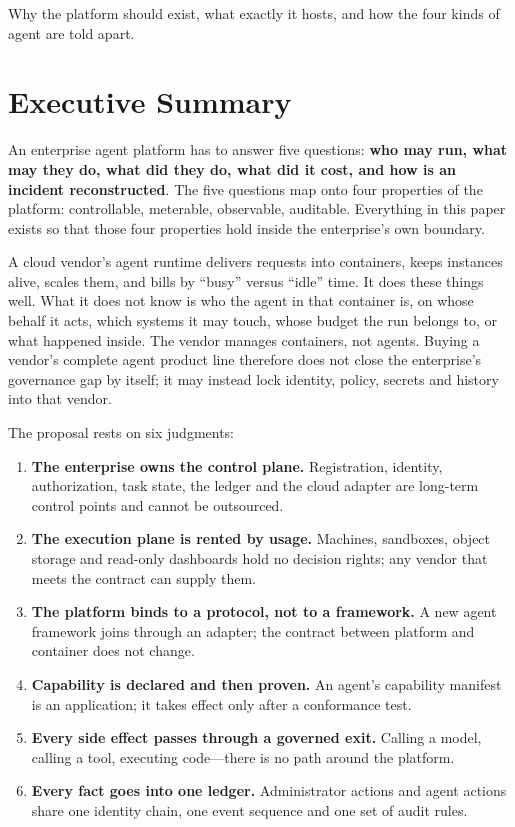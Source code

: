 {Why the platform should exist, what exactly it hosts, and how the four kinds of agent are told apart.}

\section{Executive Summary}
\label{sec:exec}

An enterprise agent platform has to answer five questions: \textbf{who may run, what may they do, what did they do, what did it cost, and how is an incident reconstructed}. The five questions map onto four properties of the platform: controllable, meterable, observable, auditable. Everything in this paper exists so that those four properties hold inside the enterprise's own boundary.

A cloud vendor's agent runtime delivers requests into containers, keeps instances alive, scales them, and bills by ``busy'' versus ``idle'' time. It does these things well. What it does not know is who the agent in that container is, on whose behalf it acts, which systems it may touch, whose budget the run belongs to, or what happened inside. The vendor manages containers, not agents. Buying a vendor's complete agent product line therefore does not close the enterprise's governance gap by itself; it may instead lock identity, policy, secrets and history into that vendor.

The proposal rests on six judgments:

\begin{enumerate}
  \item \textbf{The enterprise owns the control plane.} Registration, identity, authorization, task state, the ledger and the cloud adapter are long-term control points and cannot be outsourced.
  \item \textbf{The execution plane is rented by usage.} Machines, sandboxes, object storage and read-only dashboards hold no decision rights; any vendor that meets the contract can supply them.
  \item \textbf{The platform binds to a protocol, not to a framework.} A new agent framework joins through an adapter; the contract between platform and container does not change.
  \item \textbf{Capability is declared and then proven.} An agent's capability manifest is an application; it takes effect only after a conformance test.
  \item \textbf{Every side effect passes through a governed exit.} Calling a model, calling a tool, executing code---there is no path around the platform.
  \item \textbf{Every fact goes into one ledger.} Administrator actions and agent actions share one identity chain, one event sequence and one set of audit rules.
\end{enumerate}

